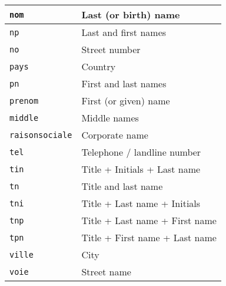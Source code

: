 \documentclass[twoside,twocolumn]{article}
\theoremstyle{definition}
\theoremstyle{remark}
\begin{document}
\begin{table}[htb]
\begin{tabular*}{0.6\textwidth}{l|l}
        \hline
        \texttt{nom} & Last (or birth) name \\
        \hline
        \texttt{np} & Last and first names \\
        \hline
        \texttt{no} & Street number \\
        \hline
        \texttt{pays} & Country \\
        \hline
        \texttt{pn} & First and last names \\
        \hline
        \texttt{prenom} & First (or given) name \\
        \hline
        \texttt{middle} & Middle names \\
        \hline
        \texttt{raisonsociale} & Corporate name \\
        \hline
        \texttt{tel} & Telephone / landline number \\
        \hline
        \texttt{tin} & Title + Initials + Last name \\
        \hline
        \texttt{tn} & Title and last name \\
        \hline
        \texttt{tni} & Title + Last name + Initials \\
        \hline
        \texttt{tnp} & Title + Last name + First name \\
        \hline
        \texttt{tpn} & Title + First name + Last name \\
        \hline
        \texttt{ville} & City \\
        \hline
        \texttt{voie} & Street name
        \label{table:outputCodes}
    \end{tabular*}
\end{table}
\end{document}
